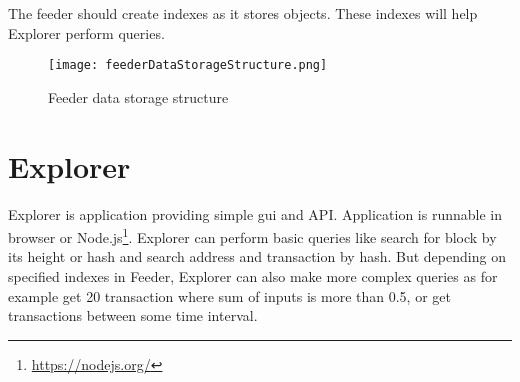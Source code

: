 The feeder should create indexes as it stores objects. These indexes will help Explorer perform queries.


\begin{figure}[H]
    \centering
    \texttt{[image: feederDataStorageStructure.png]}
    \caption{Feeder data storage structure}
    \label{feederDataStorageStructure}
\end{figure}




\section{Explorer}
Explorer is application providing simple gui and API. Application is runnable in browser or Node.js\footnote{\url{https://nodejs.org/}}. Explorer can perform basic queries like search for block by its height or hash and search address and transaction by hash. But depending on specified indexes in Feeder, Explorer can also make more complex queries as for example get 20 transaction where sum of inputs is more than 0.5, or get transactions between some time interval.



